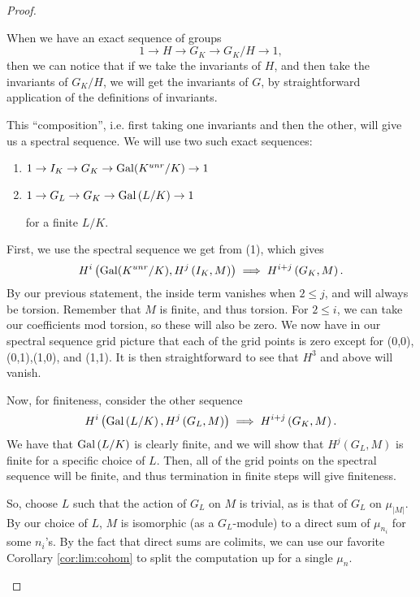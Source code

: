 \begin{proof}
\begin{enumerate}[(1)]
			When we have an exact sequence of groups
			\[
			1 \to H \to G_{K} \to G_{K} / H \to 1	
			,\] 
			then we can notice that if we take the invariants of \(H\), and
			then take the invariants of \(G_{K} / H\), we will get
			the invariants of \(G\), by straightforward application of
			the definitions of invariants.

			This ``composition'', i.e. first taking one invariants and 
			then the other, will give us a spectral sequence.
			We will use two such exact sequences:
			\begin{enumerate}[(1)]
				\item \(1 \to I_{K} \to G_{K} \to \operatorname{Gal}(K^{unr} / K) \to 1\) 
				\item \(1 \to G_{L} \to G_{K} \to \operatorname{Gal}\left( L / K \right) \to 1\) 

					for a finite \(L / K\).
			\end{enumerate}
					
			First, we use the spectral sequence we get from (1), which
			gives 
			\[
				H^{i}\left( \operatorname{Gal}(K^{unr} / K), 
				H^{j}\left( I_{K}, M \right)\right) 
				\implies H^{i + j}\left( G_{K},M \right)
			.\] 
			By our previous statement, the inside term vanishes when
			\(2 \leq j\), and will always be torsion.
			Remember that \(M\) is finite, and thus torsion.
			For \(2 \leq i\), we can take our coefficients mod torsion,
			so these will also be zero. %
			We now have in our spectral sequence grid picture that 
			each of the grid points is zero except for 
			(0,0),(0,1),(1,0), and (1,1).
			It is then straightforward to see that \(H^{3}\) and above
			will vanish.

			Now, for finiteness, consider the other sequence
			\[
				H^{i}\left( \operatorname{Gal}\left( L / K \right),
				H^{j}\left( G_{L},M \right)\right)
				\implies H^{i+j}\left( G_{K},M \right)
			.\] 
			We have that \(\operatorname{Gal}\left( L / K \right)\) is clearly finite,
			and we will show that \(H^{j}\left( G_{L},M \right)\) is
			finite for a specific choice of \(L\).
			Then, all of the grid points on the spectral sequence will
			be finite, and thus termination in finite steps will give 
			finiteness.

			So, choose \(L\) such that the action of \(G_{L}\) on \(M\) 
			is trivial, as is that of \(G_{L}\) on \(\mu_{\left| M \right|}\).
			By our choice of \(L\), \(M\) is isomorphic (as a
			\(G_{L}\)-module) to a direct sum of \(\mu_{n_{i}}\) for 
			some \(n_{i}\)'s.
			By the fact that direct sums are colimits, we can use
			our favorite Corollary \ref{cor:lim:cohom} to split
			the computation up for a single \(\mu_{n}\).


\end{enumerate}
\end{proof}

